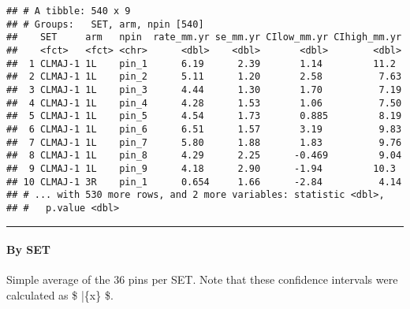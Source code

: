 \documentclass[]{article}
\newenvironment{Shaded}{\begin{snugshade}}{\end{snugshade}}
\newcommand{\KeywordTok}[1]{\textcolor[rgb]{0.13,0.29,0.53}{\textbf{#1}}}
\newcommand{\DataTypeTok}[1]{\textcolor[rgb]{0.13,0.29,0.53}{#1}}
\newcommand{\DecValTok}[1]{\textcolor[rgb]{0.00,0.00,0.81}{#1}}
\newcommand{\FloatTok}[1]{\textcolor[rgb]{0.00,0.00,0.81}{#1}}
\newcommand{\StringTok}[1]{\textcolor[rgb]{0.31,0.60,0.02}{#1}}
\newcommand{\OtherTok}[1]{\textcolor[rgb]{0.56,0.35,0.01}{#1}}
\newcommand{\OperatorTok}[1]{\textcolor[rgb]{0.81,0.36,0.00}{\textbf{#1}}}
\newcommand{\NormalTok}[1]{#1}
\let\oldparagraph\paragraph
\renewcommand{\paragraph}[1]{\oldparagraph{#1}\mbox{}}
\begin{document}
\begin{verbatim}
## # A tibble: 540 x 9
## # Groups:   SET, arm, npin [540]
##    SET     arm   npin  rate_mm.yr se_mm.yr CIlow_mm.yr CIhigh_mm.yr
##    <fct>   <fct> <chr>      <dbl>    <dbl>       <dbl>        <dbl>
##  1 CLMAJ-1 1L    pin_1      6.19      2.39       1.14         11.2 
##  2 CLMAJ-1 1L    pin_2      5.11      1.20       2.58          7.63
##  3 CLMAJ-1 1L    pin_3      4.44      1.30       1.70          7.19
##  4 CLMAJ-1 1L    pin_4      4.28      1.53       1.06          7.50
##  5 CLMAJ-1 1L    pin_5      4.54      1.73       0.885         8.19
##  6 CLMAJ-1 1L    pin_6      6.51      1.57       3.19          9.83
##  7 CLMAJ-1 1L    pin_7      5.80      1.88       1.83          9.76
##  8 CLMAJ-1 1L    pin_8      4.29      2.25      -0.469         9.04
##  9 CLMAJ-1 1L    pin_9      4.18      2.90      -1.94         10.3 
## 10 CLMAJ-1 3R    pin_1      0.654     1.66      -2.84          4.14
## # ... with 530 more rows, and 2 more variables: statistic <dbl>,
## #   p.value <dbl>
\end{verbatim}

\begin{center}\rule{0.5\linewidth}{\linethickness}\end{center}

\paragraph{By SET}\label{by-set}

Simple average of the 36 pins per SET. Note that these confidence
intervals were calculated as \$ \bar\{x\} \sigma\$.

\begin{Shaded}
\end{Shaded}
\end{document}
